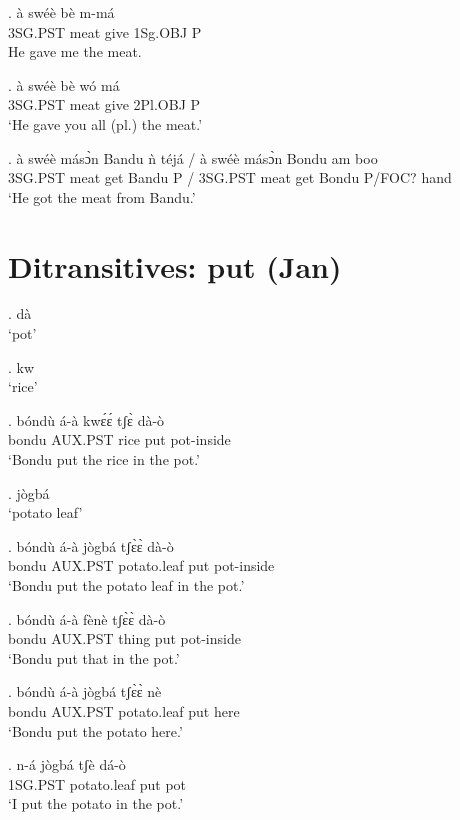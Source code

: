 \documentclass{assets/fieldnotes}
\begin{document}
\exg. à swéè bè m-má \\
3SG.PST meat give 1Sg.OBJ P\\
He gave me the meat. 

\exg. à swéè bè wó má\\
3SG.PST meat give 2Pl.OBJ P\\
`He gave you all (pl.) the meat.'


\exg. à swéè másɔ̀n Bandu ǹ téjá / à swéè másɔ̀n Bondu am boo\\
3SG.PST meat get Bandu P {} / 3SG.PST meat get Bondu P/FOC? hand\\
`He got the meat from Bandu.'




\section{Ditransitives: put (Jan)} %

\ex. dà \\
`pot'

\ex. kw \\
`rice'

\exg. bóndù á-à kwɛ́ɛ́ tʃɛ̀ dà-ò \\
bondu AUX.PST rice put pot-inside \\
`Bondu put the rice in the pot.'

\ex. jògbá \\
`potato leaf'

\exg. bóndù á-à jògbá tʃɛ̀ɛ̀ dà-ò \\
bondu AUX.PST potato.leaf put pot-inside \\
`Bondu put the potato leaf in the pot.'

\exg. bóndù á-à fènè tʃɛ̀ɛ̀ dà-ò \\
bondu AUX.PST thing put pot-inside \\
`Bondu put that in the pot.'

\exg. bóndù á-à jògbá tʃɛ̀ɛ̀ nè \\
bondu AUX.PST potato.leaf put here \\
`Bondu put the potato here.'

\exg. n-á jògbá tʃè dá-ò \\
1SG.PST potato.leaf put pot \\
`I put the potato in the pot.'
\end{document}
